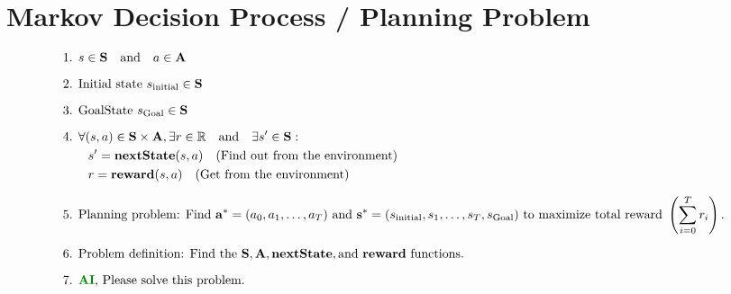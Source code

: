 \documentclass{article}
\begin{document}
\section*{Markov Decision Process / Planning Problem}

\[
\begin{aligned}
&\text{1. } s \in \mathbf{S} \quad \text{and} \quad a \in \mathbf{A} \\[6pt]
&\text{2. Initial state } s_{\text{initial}} \in \mathbf{S} \\[6pt]
&\text{3. GoalState } s_{\text{Goal}} \in \mathbf{S} \\[6pt]
&\text{4. } \forall (s, a) \in \mathbf{S} \times \mathbf{A}, \exists r \in \mathbb{R} \quad \text{and} \quad \exists s' \in \mathbf{S}: \\
&\qquad s' = \mathbf{nextState}(s, a) \quad \text{(Find out from the environment)} \\
&\qquad r = \mathbf{reward}(s, a) \quad \text{(Get from the environment)} \\[6pt]
&\text{5. Planning problem: Find } \mathbf{a}^* = (a_0, a_1, \dots, a_T) \text{ and } \mathbf{s}^* = (s_{\text{initial}}, s_1, \dots, s_T, s_{\text{Goal}}) \text{ to maximize total reward } \left(\sum_{i=0}^{T} r_i\right). \\[6pt]
&\text{6. Problem definition: Find the } \mathbf{S}, \mathbf{A}, \mathbf{nextState}, \text{and } \mathbf{reward} \text{ functions. } \\[6pt]
&\text{7. }\textcolor{thickgreen}{\textbf{AI}}\text{, Please solve this problem.}
\end{aligned}
\]
\end{document}
